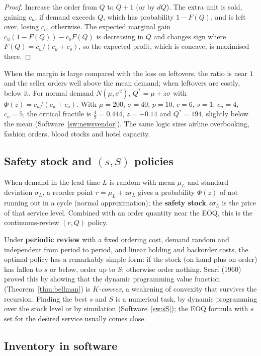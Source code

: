 \documentclass[11pt,a4paper]{article}
\numberwithin{equation}{section}
\theoremstyle{definition}
\begin{document}
\begin{proof}
Increase the order from $Q$ to $Q + 1$ (or by $dQ$). The extra unit is sold, gaining $c_u$, if demand exceeds $Q$, which has probability $1 - F(Q)$, and is left over, losing $c_o$, otherwise. The expected marginal gain $c_u(1 - F(Q)) - c_oF(Q)$ is decreasing in $Q$ and changes sign where $F(Q) = c_u/(c_u + c_o)$, so the expected
profit, which is concave, is maximised there.
\end{proof}

When the margin is large compared with the loss on leftovers, the ratio is near $1$ and the seller orders well above the mean demand; when leftovers are costly, below it. For normal demand $N(\mu, \sigma^2)$, $Q^* = \mu + z\sigma$ with $\Phi(z) = c_u/(c_u + c_o)$. With $\mu = 200$, $\sigma = 40$, $p = 10$, $c = 6$, $s = 1$: $c_u = 4$,
$c_o = 5$, the critical fractile is $\frac49 = 0.444$, $z = -0.14$ and $Q^* = 194$, slightly below the mean (Software~\ref{sw:newsvendor}). The same logic sizes airline overbooking, fashion orders, blood stocks and hotel capacity.

\subsection{Safety stock and $(s, S)$ policies}
\label{ssec:sS}

When demand in the lead time $L$ is random with mean $\mu_L$ and standard deviation $\sigma_L$, a reorder point $r = \mu_L + z\sigma_L$ gives a probability $\Phi(z)$ of not running out in a cycle (normal approximation); the \textbf{safety stock} $z\sigma_L$ is the price of that service level. Combined with an order quantity near the EOQ,
this is the continuous-review $(r, Q)$ policy.

Under \textbf{periodic review} with a fixed ordering cost, demand random and independent from period to period, and linear holding and backorder costs, the optimal policy has a remarkably simple form: if the stock (on hand plus on order) has fallen to $s$ or below, order up to $S$; otherwise order nothing. Scarf (1960) proved this by showing that the
dynamic programming value function (Theorem~\ref{thm:bellman}) is \emph{$K$-convex}, a weakening of convexity that survives the recursion. Finding the best $s$ and $S$ is a numerical task, by dynamic programming over the stock level or by simulation (Software~\ref{sw:sS}); the EOQ formula with $s$ set for the desired service usually comes close.

\subsection{Inventory in software}
\label{ssec:software13}
\end{document}
